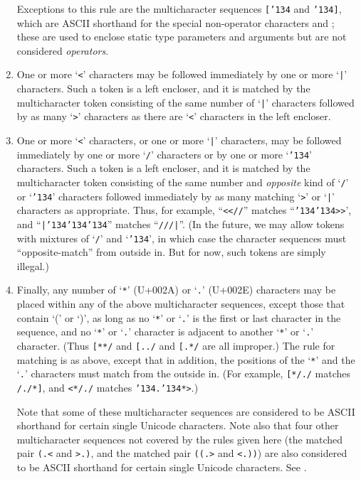 \begin{enumerate}
Exceptions to this rule are the multicharacter sequences \texttt{[{\char'134}}
and \texttt{{\char'134}]}, which are ASCII shorthand for the special non-operator
characters \EXP{\llbracket} and \EXP{\rrbracket}; these are used to enclose static type
parameters and arguments but are not considered \emph{operators}.


\item
One or more `\texttt{<}' characters may be followed immediately
by one or more `\texttt{|}' characters.
Such a token is a left encloser,
and it is matched by the multicharacter token
consisting of the same number of `\texttt{|}' characters
followed by as many `\texttt{>}' characters
as there are `\texttt{<}' characters in the left encloser.

\item
One or more `\texttt{<}' characters,
or one or more `\texttt{|}' characters,
may be followed immediately
by one or more `\texttt{/}' characters
or by one or more `\texttt{\char'134}' characters.
Such a token is a left encloser,
and it is matched by the multicharacter token
consisting of the same number and \emph{opposite} kind
of `\texttt{/}' or `\texttt{\char'134}' characters
followed immediately by as many matching `\texttt{>}' or `\texttt{|}'
characters as appropriate.
Thus, for example,
``\texttt{<<//}'' matches ``\texttt{{\char'134}{\char'134}>>}',
and ``\texttt{|{\char'134}{\char'134}{\char'134}}'' matches ``\texttt{///|}''.
(In the future,
we may allow tokens with mixtures of `\texttt{/}' and `\texttt{\char'134}',
in which case the character sequences must ``opposite-match'' from outside in.
But for now, such tokens are simply illegal.)

\item
Finally,
any number of `\texttt{*}' (U+002A)
or `\texttt{.}' (U+002E) characters may be placed
within any of the above multicharacter sequences,
except those that contain `(' or `)',
as long as no `\texttt{*}' or `\texttt{.}'
is the first or last character in the sequence,
and no `\texttt{*}' or `\texttt{.}' character is adjacent
to another `\texttt{*}' or `\texttt{.}' character.
(Thus \texttt{[**/} and \texttt{[../} and \texttt{[.*/} are
all improper.)
The rule for matching is as above,
except that in addition,
the positions of the `\texttt{*}' and the `\texttt{.}' characters
must match from the outside in.  (For example, \texttt{[*/./} matches
\texttt{/./*]}, and \texttt{<*/./} matches
\texttt{{\char'134}.{\char'134}*>}.)

Note that some of these multicharacter sequences are considered to
be ASCII shorthand for certain single Unicode characters.  Note also
that four other multicharacter sequences not covered by the rules
given here (the matched pair \texttt{(.<} and \texttt{>.)}, and the
matched pair \texttt{((.>} and \texttt{<.))}) are also considered to
be ASCII shorthand for certain single Unicode characters.
See .



\end{enumerate}

